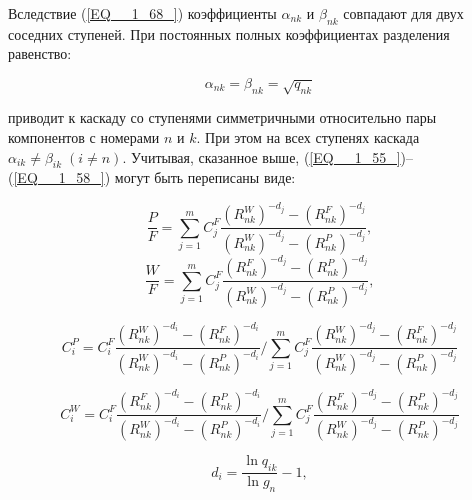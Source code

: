 Вследствие (\ref{EQ__1_68_}) коэффициенты $\alpha _{nk} $ и $\beta _{nk} $ совпадают для двух соседних ступеней. При постоянных полных коэффициентах разделения равенство:

\begin{equation} \label{EQ__1_69_} 
  \alpha _{nk} =\beta _{nk} =\sqrt{q_{nk} }  
\end{equation} 

приводит к каскаду со ступенями симметричными относительно пары компонентов с номерами $n$ и $k$. При этом на всех ступенях каскада $\alpha _{ik} \ne \beta _{ik} \; (i\ne n)$. Учитывая, сказанное выше, (\ref{EQ__1_55_})--(\ref{EQ__1_58_}) могут быть переписаны виде:
  

\begin{equation} \label{EQ__1_70_} 
  \frac{P}{F} =\sum _{j=1}^{m}C_{j}^{F} \frac{(R_{nk}^{W} )^{-d_{j} } -(R_{nk}^{F} )^{-d_{j} } }{(R_{nk}^{W} )^{-d_{j} } -(R_{nk}^{P} )^{-d_{j} } }  ,                                            
  \end{equation} 
  \begin{equation} \label{EQ__1_71_} 
  \frac{W}{F} =\sum _{j=1}^{m}C_{j}^{F} \frac{(R_{nk}^{F} )^{-d_{j} } -(R_{nk}^{P} )^{-d_{j} } }{(R_{nk}^{W} )^{-d_{j} } -(R_{nk}^{P} )^{-d_{j} } }  ,                                        
\end{equation} 

\begin{equation} \label{EQ__1_72_} 
  C_{i}^{P}=C_{i}^{F} \frac{\left(R_{n k}^{W}\right)^{-d_{i}}-\left(R_{n k}^{F}\right)^{-d_{i}}}{\left(R_{n k}^{W}\right)^{-d_{i}}-\left(R_{n k}^{P}\right)^{-d_{i}}} / \sum_{j=1}^{m} C_{j}^{F} \frac{\left(R_{n k}^{W}\right)^{-d_{j}}-\left(R_{n k}^{F}\right)^{-d_{j}}}{\left(R_{n k}^{W}\right)^{-d_{j}}-\left(R_{n k}^{P}\right)^{-d_{j}}}
\end{equation} 

\begin{equation} \label{EQ__1_73_} 
  C_{i}^{W}=C_{i}^{F} \frac{\left(R_{n k}^{F}\right)^{-d_{i}}-\left(R_{n k}^{P}\right)^{-d_{i}}}{\left(R_{n k}^{W}\right)^{-d_{i}}-\left(R_{n k}^{P}\right)^{-d_{i}}} / \sum_{j=1}^{m} C_{j}^{F} \frac{\left(R_{n k}^{F}\right)^{-d_{j}}-\left(R_{n k}^{P}\right)^{-d_{j}}}{\left(R_{n k}^{W}\right)^{-d_{j}}-\left(R_{n k}^{P}\right)^{-d_{j}}}
\end{equation} 

\begin{equation} \label{EQ__1_74_} 
  d_{i} =\frac{\ln q_{ik} }{\ln g_{n} } -1,              
\end{equation}

